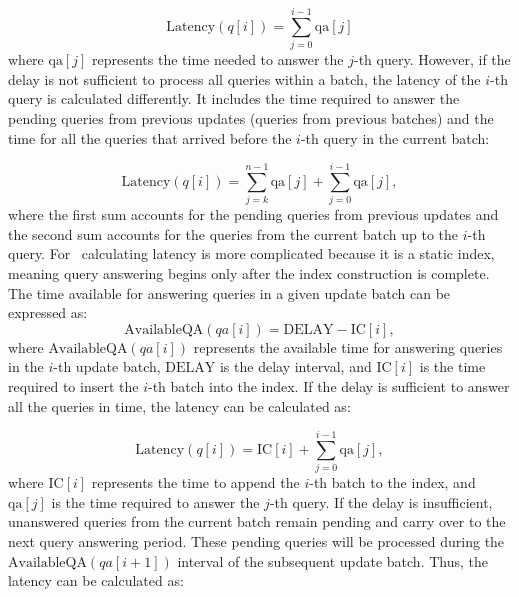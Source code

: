 \begin{equation}
\text{Latency}(q[i]) = \sum_{j=0}^{i-1} \text{qa}[j]
\end{equation}
% 
where $\text{qa}[j]$ represents the time needed to answer the $j$-th query.
% 
However, if the delay is not sufficient to process all queries within a batch, 
the latency of the $i$-th query is calculated differently. It includes the time 
required to answer the pending queries from previous updates (queries from previous batches) 
and the time for all the queries that arrived before the $i$-th query in the current batch:

\begin{equation}
\text{Latency}(q[i]) = \sum_{j=k}^{n-1} \text{qa}[j] + \sum_{j=0}^{i-1} \text{qa}[j],
\end{equation}
% 
where the first sum accounts for the pending queries from previous updates
and the second sum accounts for the queries from the current batch up to the $i$-th query.
%
For \Fresh\, calculating latency is more complicated because it is a static index, meaning 
query answering begins only after the index construction is complete. The time available 
for answering queries in a given update batch can be expressed as:
\begin{equation}
\text{AvailableQA}(qa[i]) = \text{DELAY} - \text{IC}[i],
\end{equation}
% 
where $\text{AvailableQA}(qa[i])$ represents the available time for answering queries 
in the $i$-th update batch, $\text{DELAY}$ is the delay interval, and $\text{IC}[i]$ 
is the time required to insert the $i$-th batch into the index.
% 
If the delay is sufficient to answer all the queries in time, the latency can be calculated as:

\begin{equation}
\text{Latency}(q[i]) = \text{IC}[i] + \sum_{j=0}^{i-1} \text{qa}[j],
\end{equation}
% 
where $\text{IC}[i]$ represents the time to append the $i$-th batch to the index, and 
$\text{qa}[j]$ is the time required to answer the $j$-th query. If the delay is insufficient, 
unanswered queries from the current batch remain pending and carry over to the next query 
answering period. These pending queries will be processed during the 
$\text{AvailableQA}(qa[i+1])$ interval of the subsequent update batch. 
Thus, the latency can be calculated as:

